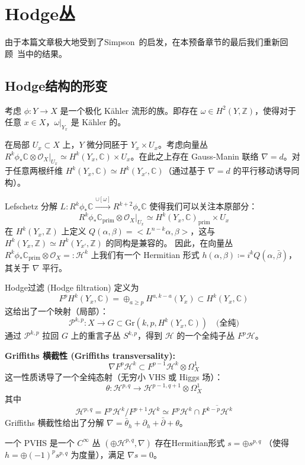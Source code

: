\section{Hodge丛}
由于本篇文章极大地受到了Simpson~\cite{Si1}的启发，在本预备章节的最后我们重新回顾~\cite{Si1}当中的结果。
\subsection{Hodge结构的形变}
考虑 $\phi: Y \to X$ 是一个极化 Kähler 流形的族。即存在 $\omega \in H^2(Y, \mathbb{Z})$，使得对于任意 $x \in X$，$\omega|_{Y_x}$ 是 Kähler 的。

在局部 $U_x \subset X$ 上，$Y$ 微分同胚于 $Y_x \times U_x$。考虑向量丛 $R^k\phi_* \mathbb{C} \otimes \mathcal{O}_X|_{U_x} \simeq H^k(Y_x, \mathbb{C}) \times U_x$。在此之上存在 Gauss-Manin 联络 $\nabla = d$。对于任意两根纤维 $H^k(Y_x, \mathbb{C}) \simeq H^k(Y_{x'}, \mathbb{C})$（通过基于 $\nabla=d$ 的平行移动诱导同构）。

Lefschetz 分解 $L: R^k\phi_* \mathbb{C} \xrightarrow{\cup [\omega]} R^{k+2}\phi_* \mathbb{C}$ 使得我们可以关注本原部分：
\[ R^k\phi_*\mathbb{C}_{\text{prim}} \otimes \mathcal{O}_X |_{U_x} \simeq H^k(Y_x, \mathbb{C})_{\text{prim}} \times U_x \]
在 $H^k(Y_x, \mathbb{Z})$ 上定义 $Q(\alpha, \beta) = <L^{n-k}\alpha, \beta>$，这与 $H^k(Y_x, \mathbb{Z}) \simeq H^k(Y_{x'}, \mathbb{Z})$ 的同构是兼容的。
因此，在向量丛 $R^k\phi_* \mathbb{C}_{\text{prim}} \otimes \mathcal{O}_X =: \mathcal{H}^k$ 上我们有一个 Hermitian 形式 $h(\alpha, \beta) \coloneqq i^{k} Q(\alpha, \bar{\beta})$，其关于 $\nabla$ 平行。

Hodge过滤 (Hodge filtration) 定义为 \[F^p H^k(Y_x, \mathbb{C}) = \oplus_{a \ge p} H^{a, k-a}(Y_x) \subset H^k(Y_x, \mathbb{C})\]
这给出了一个映射（局部）：
\[ \mathcal{P}^{k,p}: X \to G \subset \text{Gr}(k, p, H^k(Y_x, \mathbb{C})) \quad \text{(全纯)} \]
通过 $\mathcal{P}^{k,p}$ 拉回 $G$ 上的重言子丛 $S^{k,p}$，得到 $\mathcal{H}$ 的一个全纯子丛 $F^p\mathcal{H}$。

\textbf{Griffiths 横截性 (Griffiths transversality):}
\[ \nabla F^p \mathcal{H}^k \subset F^{p-1}\mathcal{H}^k \otimes \Omega_X^1 \]
这一性质诱导了一个全纯态射（无穷小 VHS 或 Higgs 场）：
\[ \theta: \mathcal{H}^{p,q} \to \mathcal{H}^{p-1, q+1} \otimes \Omega_X^1 \]
其中
\[
\mathcal{H}^{p,q} = F^p\mathcal{H}^k / F^{p+1}\mathcal{H}^k \simeq F^p\mathcal{H}^k \cap \overline{F^{k-p}\mathcal{H}^k}
\]
Griffiths 横截性给出了分解 $\nabla = \bar{\theta}_h + \partial_h + \bar{\partial} + \theta$。

\begin{definition}
一个 PVHS 是一个 $C^\infty$ 丛 $(\oplus \mathcal{H}^{p,q}, \nabla)$ 存在Hermitian形式 $s = \oplus s^{p,q}$ （使得 $h = \oplus (-1)^p s^{p,q}$ 为度量），满足 $\nabla s = 0$。
\end{definition}

